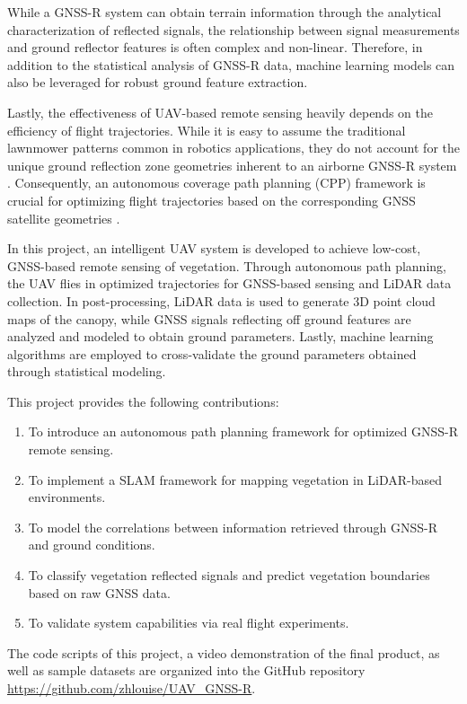 \documentclass[10pt, a4paper]{article}
\begin{document}
While a GNSS-R system can obtain terrain information through the analytical characterization of reflected signals, the relationship between signal measurements and ground reflector features is often complex and non-linear. Therefore, in addition to the statistical analysis of GNSS-R data, machine learning models can also be leveraged for robust ground feature extraction. 

Lastly, the effectiveness of UAV-based remote sensing heavily depends on the efficiency of flight trajectories. While it is easy to assume the traditional lawnmower patterns common in robotics applications, they do not account for the unique ground reflection zone geometries inherent to an airborne GNSS-R system \cite{GALCERAN20131258, yu2021theory}. Consequently, an autonomous coverage path planning (CPP) framework is crucial for optimizing flight trajectories based on the corresponding GNSS satellite geometries \cite{Cabreira2019}. 

In this project, an intelligent UAV system is developed to achieve low-cost, GNSS-based remote sensing of vegetation. Through autonomous path planning, the UAV flies in optimized trajectories for GNSS-based sensing and LiDAR data collection. In post-processing, LiDAR data is used to generate 3D point cloud maps of the canopy, while GNSS signals reflecting off ground features are analyzed and modeled to obtain ground parameters. Lastly, machine learning algorithms are employed to cross-validate the ground parameters obtained through statistical modeling.

This project provides the following contributions:

\begin{enumerate}[nosep]
\item To introduce an autonomous path planning framework for optimized GNSS-R remote sensing.
\item To implement a SLAM framework for mapping vegetation in LiDAR-based environments.
\item To model the correlations between information retrieved through GNSS-R and ground conditions. 
\item To classify vegetation reflected signals and predict vegetation boundaries based on raw GNSS data.
\item To validate system capabilities via real flight experiments.
\end{enumerate}

The code scripts of this project, a video demonstration of the final product, as well as sample datasets are organized into the GitHub repository \url{https://github.com/zhlouise/UAV_GNSS-R}.
\end{document}
